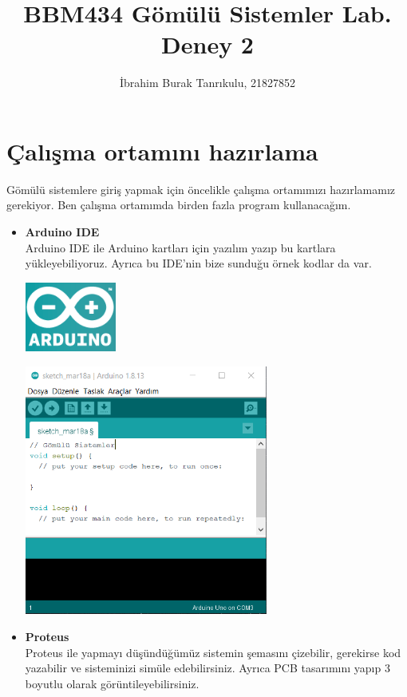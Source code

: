 \documentclass[11pt]{article}
\author{İbrahim Burak Tanrıkulu, 21827852}
\title{BBM434 Gömülü Sistemler Lab.\\Deney 2}
\begin{document}
\maketitle

\section{Çalışma ortamını hazırlama}
Gömülü sistemlere giriş yapmak için öncelikle çalışma ortamımızı hazırlamamız gerekiyor. Ben çalışma ortamımda birden fazla program kullanacağım. 
\begin{itemize}
\item {\bf Arduino IDE}\\
Arduino IDE ile Arduino kartları için yazılım yazıp bu kartlara yükleyebiliyoruz. Ayrıca bu IDE'nin bize sunduğu örnek kodlar da var.\\
\begin{minipage}{0.4\textwidth}
\includegraphics[width=3cm]{arduino_ide.png}
\centering
\end{minipage}
\begin{minipage}{0.4\textwidth}
\includegraphics[width=8cm]{arduino.png}
\centering
\end{minipage}
\item {\bf Proteus}\\
Proteus ile yapmayı düşündüğümüz sistemin şemasını çizebilir, gerekirse kod yazabilir ve sisteminizi simüle edebilirsiniz. Ayrıca PCB tasarımını yapıp 3 boyutlu olarak görüntileyebilirsiniz.\\

\end{itemize}
\end{document}
